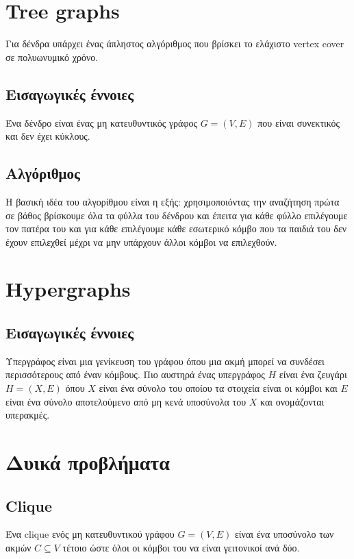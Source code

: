 \section{Tree graphs}
Για δένδρα υπάρχει ένας άπληστος αλγόριθμος που βρίσκει το ελάχιστο vertex cover σε πολυωνυμικό χρόνο.

\subsection{Εισαγωγικές έννοιες}
Ένα δένδρο είναι ένας μη κατευθυντικός γράφος $G=(V,E)$ που είναι συνεκτικός και δεν έχει κύκλους.

\subsection{Αλγόριθμος}
Η βασική ιδέα του αλγορίθμου είναι η εξής: χρησιμοποιόντας την αναζήτηση πρώτα σε βάθος βρίσκουμε όλα τα φύλλα του δένδρου και έπειτα για κάθε φύλλο επιλέγουμε τον πατέρα του και για κάθε επιλέγουμε κάθε εσωτερικό κόμβο που τα παιδιά του δεν έχουν επιλεχθεί μέχρι να μην υπάρχουν άλλοι κόμβοι να επιλεχθούν.

\section{Hypergraphs}
\subsection{Εισαγωγικές έννοιες}
Υπεργράφος είναι μια γενίκευση του γράφου όπου μια ακμή μπορεί να συνδέσει περισσότερους από έναν κόμβους. Πιο αυστηρά ένας υπεργράφος $H$ είναι ένα ζευγάρι $H=(X,E)$ όπου $X$ είναι ένα σύνολο του οποίου τα στοιχεία είναι οι κόμβοι και $E$ είναι ένα σύνολο αποτελούμενο από μη κενά υποσύνολα του $X$ και ονομάζονται υπερακμές. 


\section{Δυικά προβλήματα}

\subsection{Clique}
Ένα clique ενός μη κατευθυντικού γράφου $G=(V,E)$ είναι ένα υποσύνολο των ακμών $C \subseteq V$ τέτοιο ώστε όλοι οι κόμβοι του να είναι γειτονικοί ανά δύο.\\
\\

